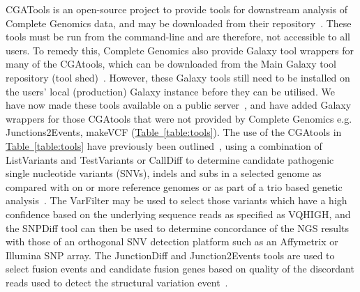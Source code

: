 CGATools is an open-source project to provide tools for downstream analysis of Complete Genomics data, and may be downloaded from their repository~\cite{url-cgatools}. These tools must be run from the command-line and are therefore, not accessible to all users. To remedy this, Complete Genomics also provide Galaxy tool wrappers for many of the CGAtools, which can be downloaded from the Main Galaxy tool repository (tool shed)~\cite{url-toolshed}. However, these Galaxy tools still need to be installed on the users’ local (production) Galaxy instance before they can be utilised. We have now made these tools available on a public server~\cite{url-nbicgalaxy}, and have added Galaxy wrappers for those CGAtools that were not provided by Complete Genomics e.g. Junctions2Events, makeVCF (\hyperref[table:tools]{Table~\ref{table:tools}}). The use of the CGAtools in \hyperref[table:tools]{Table~\ref{table:tools}} have previously been outlined~\cite{nieminen}, using a combination of ListVariants and TestVariants or CallDiff to determine candidate pathogenic single nucleotide variants (SNVs), indels and subs in a selected genome as compared with on or more reference genomes or as part of a trio based genetic analysis~\cite{nieminen}. The VarFilter may be used to select those variants which have a high confidence based on the underlying sequence reads as specified as VQHIGH, and the SNPDiff tool can then be used to determine concordance of the NGS results with those of an orthogonal SNV detection platform such as an Affymetrix or Illumina SNP array. The JunctionDiff and Junction2Events tools are used to select fusion events and candidate fusion genes based on quality of the discordant reads used to detect the structural variation event~\cite{ifuse}.


